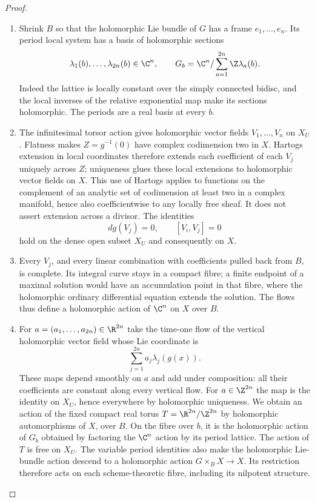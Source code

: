 \begin{proof}

\begin{enumerate}[label={$\langle1\rangle$\arabic*.},leftmargin=*]
\item Shrink $B$ so that the holomorphic Lie bundle of $G$ has a
frame $e_1,\ldots,e_n$.  Its period local system has a basis
of holomorphic sections
\[
 \lambda_1(b),\ldots,\lambda_{2n}(b)\in\C^n,
 \qquad
 G_b=\C^n/\sum_{a=1}^{2n}\Z\lambda_a(b).
\]
Indeed the lattice is locally constant over the simply
connected bidisc, and the local inverses of the relative
exponential map make its sections holomorphic.  The periods
are a real basis at every $b$.

\item The infinitesimal torsor action gives holomorphic vector
fields $V_1,\ldots,V_n$ on $X_U$.  Flatness makes
$Z=g^{-1}(0)$ have complex codimension two in $X$.
Hartogs extension in local coordinates therefore extends
each coefficient of each $V_j$ uniquely across $Z$; uniqueness
glues these local extensions to holomorphic vector fields
on $X$.  This use of Hartogs applies to functions on the
complement of an analytic set of codimension at least two
in a complex manifold, hence also coefficientwise to any
locally free sheaf.  It does not assert extension across a
divisor.  The identities
\[
 dg(V_j)=0,\qquad [V_i,V_j]=0
\]
hold on the dense open subset $X_U$ and consequently on $X$.

\item Every $V_j$, and every linear combination with coefficients
pulled back from $B$, is complete.  Its integral curve stays
in a compact fibre; a finite endpoint of a maximal solution
would have an accumulation point in that fibre, where the
holomorphic ordinary differential equation extends the
solution.  The flows thus define a holomorphic action of
$\C^n$ on $X$ over $B$.

\item For $a=(a_1,\ldots,a_{2n})\in\R^{2n}$ take the time-one
flow of the vertical holomorphic vector field whose Lie
coordinate is
\[
 \sum_{j=1}^{2n}a_j\lambda_j(g(x)).
\]
These maps depend smoothly on $a$ and add under composition:
all their coefficients are constant along every vertical
flow.  For $a\in\Z^{2n}$ the map is the identity on $X_U$,
hence everywhere by holomorphic uniqueness.  We obtain an
action of the fixed compact real torus
$T=\R^{2n}/\Z^{2n}$ by holomorphic automorphisms of $X$,
over $B$.  On the fibre over $b$, it is the holomorphic
action of $G_b$ obtained by factoring the $\C^n$ action by
its period lattice.  The action of $T$ is free on $X_U$.
The variable period identities also make the holomorphic
Lie-bundle action descend to a holomorphic action
$G\times_BX\to X$.  Its restriction therefore acts on
each scheme-theoretic fibre, including its nilpotent
structure.


\end{enumerate}
\end{proof}
